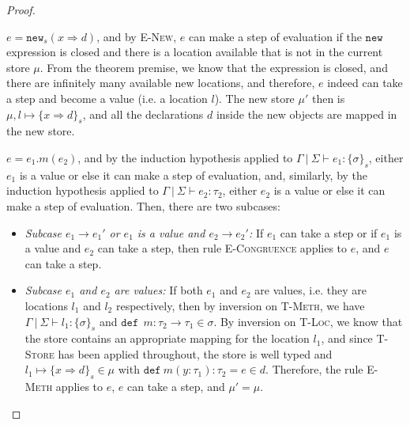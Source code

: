 \documentclass{llncs}
\newcommand{\keywadj}[1]{\mathtt{#1}}
\newcommand{\keyw}[1]{\keywadj{#1}~}
\newcommand{\pcase}[1][]{
  \if\relax\detokenize{#1}\relax
    \def\thiscase{}
  \else
    \def\thiscase{~#1}
  \fi
  \item
}
\begin{document}
\begin{proof}
\begin{pcases}
\pcase[\textsc{T-New}]
$e = \keywadj{new}_{s}(x \Rightarrow d)$, and by \textsc{E-New}, $e$ can make a step of evaluation if the $\keyw{new}$ expression is closed and there is a location available that is not in the current store $\mu$. From the theorem premise, we know that the expression is closed, and there are infinitely many available new locations, and therefore, $e$ indeed can take a step and become a value (i.e. a location $l$). The new store $\mu'$ then is $\mu, l \mapsto \{ x \Rightarrow d \}_{s}$, and all the declarations $d$ inside the new objects are mapped in the new store.
\\
\pcase[\textsc{T-Meth}]
$e = e_1.m(e_2)$, and by the induction hypothesis applied to $\Gamma~|~\Sigma \vdash e_1 : \{\sigma\}_s$, either $e_1$ is a value or else it can make a step of evaluation, and, similarly, by the induction hypothesis applied to $\Gamma~|~\Sigma \vdash e_2 : \tau_2$, either $e_2$ is a value or else it can make a step of evaluation. Then, there are two subcases:
\\
\begin{itemize}
\item[]  \textit{Subcase $e_1 \longrightarrow e_1'$ or $e_1$ is a value and $e_2 \longrightarrow e_2'$:} If $e_1$ can take a step or if $e_1$ is a value and $e_2$ can take a step, then rule \textsc{E-Congruence} applies to $e$, and $e$ can take a step.
\\
\item[]  \textit{Subcase $e_1$ and $e_2$ are values:} If both $e_1$ and $e_2$ are values, i.e. they are locations $l_1$ and $l_2$ respectively, then by inversion on \textsc{T-Meth}, we have $\Gamma~|~\Sigma \vdash l_1 : \{\sigma\}_s$ and $\keyw{def}~ m : \tau_2 \rightarrow \tau_1 \in \sigma$. By inversion on \textsc{T-Loc}, we know that the store contains an appropriate mapping for the location $l_1$, and since \textsc{T-Store} has been applied throughout, the store is well typed and $l_1 \mapsto \{ x \Rightarrow d \}_{s} \in \mu$ with $\keyw{def} m(y : \tau_1) : \tau_2 = e \in d$. Therefore, the rule \textsc{E-Meth} applies to $e$, $e$ can take a step, and $\mu' = \mu$.
\\
\end{itemize}


\end{pcases}
\end{proof}
\end{document}
